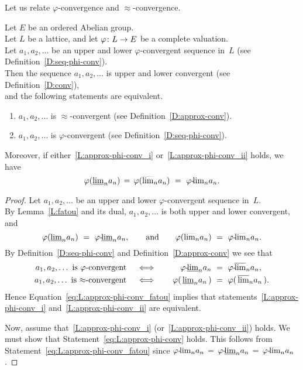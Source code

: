 \documentclass[main.tex]{subfiles}
\begin{document}
\noindent
Let us relate $\varphi$-convergence
and $\approx$-convergence.
%
%
\begin{lem}
\label{L:approx-phi-conv}
Let $E$ be an ordered Abelian group.\\
Let $L$ be a lattice,
and let $\varphi\colon L \rightarrow E$ be a 
complete valuation.\\
Let $a_1,a_2,\dotsc$ be an upper and lower $\varphi$-convergent
sequence in~$L$
(see Definition~\ref{D:seq-phi-conv}). \\
Then the sequence $a_1,a_2,\dotsc$
is upper and lower convergent (see Definition~\ref{D:conv}),\\
and the following statements are equivalent.
\begin{enumerate}
\item 
\label{L:approx-phi-conv_i}
$a_1,a_2,\dotsc$ is $\approx$-convergent
(see Definition~\ref{D:approx-conv}).

\item 
\label{L:approx-phi-conv_ii}
$a_1,a_2,\dotsc$ is $\varphi$-convergent
(see Definition~\ref{D:seq-phi-conv}).
\end{enumerate}
Moreover, if 
either~\ref{L:approx-phi-conv_i}
or~\ref{L:approx-phi-conv_ii} holds, we have
\begin{equation}
\label{eq:L:approx-phi-conv}
\varphi(\llim{n}a_n) \,=\, \varphi(\ulim{n} a_n) 
\ =\ 
\plim\varphi{n} a_n.
\end{equation}
\end{lem}
\begin{proof}
Let $a_1,a_2,\dotsc$ be an upper and lower
$\varphi$-convergent sequence in~$L$.\\
By Lemma~\ref{L:fatou}
and its dual,
$a_1,a_2,\dotsc$
is both upper and lower convergent, and
\begin{equation}
\label{eq:L:approx-phi-conv_fatou}
\varphi(\smash{\underline{\lim}_{n}} a_n) \ = \ {\varphi}\text{-}\!\smash{\underline{\lim}_{n}}a_n,
\qquad\text{and}\qquad
\varphi(\smash{\overline{\lim}_{n}} a_n) \ =\ {\varphi}\text{-}\!\smash{\overline{\lim}_{n}}a_n.
\end{equation}
By Definition~\ref{D:seq-phi-conv}
and Definition~\ref{D:approx-conv}
we see that
\begin{alignat*}{3}
\text{$a_1,a_2,\dotsc$ is $\varphi$-convergent}
\quad&\iff\quad&
{\varphi}\text{-}\!\smash{\underline{\lim}_{n}}a_n \ &=\ {\varphi}\text{-}\!\smash{\overline{\lim}_{n}}a_n,\\
\text{$a_1,a_2,\dotsc$ is $\approx$-convergent}
\quad&\iff\quad&
\varphi(\, \smash{\underline{\lim}_{n}}a_n\,) \ &=\ \varphi(\,\smash{\overline{\lim}_{n}}a_n\,).
\end{alignat*}
Hence Equation~\eqref{eq:L:approx-phi-conv_fatou}
implies that statements~\ref{L:approx-phi-conv_i}
and~\ref{L:approx-phi-conv_ii} are equivalent.

Now, assume that~\ref{L:approx-phi-conv_i}
(or~\ref{L:approx-phi-conv_ii}) holds.
We must show  that Statement~\eqref{eq:L:approx-phi-conv}
holds.
This follows from Statement~\eqref{eq:L:approx-phi-conv_fatou}
since ${\varphi}\text{-}\!{\lim}_{n}a_n \,=\,{\varphi}\text{-}\!\smash{\underline{\lim}_{n}}a_n \,=\, {\varphi}\text{-}\!\smash{\overline{\lim}_{n}}a_n$.
\end{proof}
\end{document}
